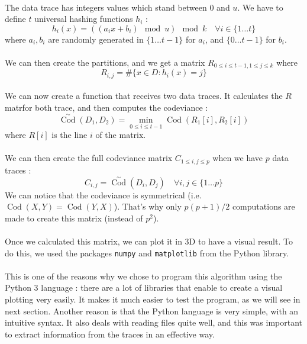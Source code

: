 \documentclass[a4paper]{article}%
\DeclareMathOperator{\Cod}{Cod}
\newcommand{\CodSk}{\overset{\sim}{\Cod}}
\begin{document}
\paragraph{}The data trace has integers values which stand between $0$ and $u$. We have to define $t$ universal hashing functions $h_i$ :
	\[ h_i(x) = ((a_ix+b_i) \mod u) \mod k \quad \forall i \in \lbrace 1 \ldots t \rbrace \]
where $a_i, b_i$ are randomly generated in $\lbrace 1 \dots t-1 \rbrace$ for $a_i$, and $\lbrace 0 \ldots t-1 \rbrace$ for $b_i$.

\paragraph{}We can then create the partitions, and we get a matrix $R_{0 \leq i \leq t-1, 1 \leq j \leq k}$ where 
 	\[ R_{i,j} = \# \lbrace x \in D : h_i(x) = j \rbrace \]
 	
\paragraph{}We can now create a function that receives two data traces. It calculates the $R$ matrfor both trace, and then computes the codeviance :
	\[ \CodSk(D_1, D_2) = \underset{0 \leq i \leq t-1}{\min} \Cod(R_1[i], R_2[i]) \]
where $R[i]$ is the line $i$ of the matrix.

\paragraph{}We can then create the full codeviance matrix $C_{1 \leq i,j \leq p}$ when we have $p$ data traces :
	\[ C_{i,j} = \CodSk(D_i, D_j) \quad \forall i,j \in \lbrace 1 \ldots p \rbrace \]
We can notice that the codeviance is symmetrical (i.e. $\Cod(X,Y) = \Cod(Y,X)$). That's why only $p(p+1)/2$ computations are made to create this matrix (instead of $p^2$).

\paragraph{}Once we calculated this matrix, we can plot it in 3D to have a visual result. To do this, we used the packages \texttt{numpy} and \texttt{matplotlib} from the Python library.

\paragraph{}This is one of the reasons why we chose to program this algorithm using the Python 3 language : there are a lot of libraries that enable to create a visual plotting very easily. It makes it much easier to test the program, as we will see in next section. Another reason is that the Python language is very simple, with an intuitive syntax. It also deals with reading files quite well, and this was important to extract information from the traces in an effective way.
\end{document}
